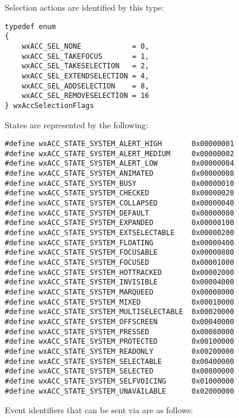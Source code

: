 Selection actions are identified by
this type:

{\small 
\begin{verbatim}
typedef enum
{
    wxACC_SEL_NONE            = 0,
    wxACC_SEL_TAKEFOCUS       = 1,
    wxACC_SEL_TAKESELECTION   = 2,
    wxACC_SEL_EXTENDSELECTION = 4,
    wxACC_SEL_ADDSELECTION    = 8,
    wxACC_SEL_REMOVESELECTION = 16
} wxAccSelectionFlags
\end{verbatim}
}

States are represented by the following:

{\small 
\begin{verbatim}
#define wxACC_STATE_SYSTEM_ALERT_HIGH       0x00000001
#define wxACC_STATE_SYSTEM_ALERT_MEDIUM     0x00000002
#define wxACC_STATE_SYSTEM_ALERT_LOW        0x00000004
#define wxACC_STATE_SYSTEM_ANIMATED         0x00000008
#define wxACC_STATE_SYSTEM_BUSY             0x00000010
#define wxACC_STATE_SYSTEM_CHECKED          0x00000020
#define wxACC_STATE_SYSTEM_COLLAPSED        0x00000040
#define wxACC_STATE_SYSTEM_DEFAULT          0x00000080
#define wxACC_STATE_SYSTEM_EXPANDED         0x00000100
#define wxACC_STATE_SYSTEM_EXTSELECTABLE    0x00000200
#define wxACC_STATE_SYSTEM_FLOATING         0x00000400
#define wxACC_STATE_SYSTEM_FOCUSABLE        0x00000800
#define wxACC_STATE_SYSTEM_FOCUSED          0x00001000
#define wxACC_STATE_SYSTEM_HOTTRACKED       0x00002000
#define wxACC_STATE_SYSTEM_INVISIBLE        0x00004000
#define wxACC_STATE_SYSTEM_MARQUEED         0x00008000
#define wxACC_STATE_SYSTEM_MIXED            0x00010000
#define wxACC_STATE_SYSTEM_MULTISELECTABLE  0x00020000
#define wxACC_STATE_SYSTEM_OFFSCREEN        0x00040000
#define wxACC_STATE_SYSTEM_PRESSED          0x00080000
#define wxACC_STATE_SYSTEM_PROTECTED        0x00100000
#define wxACC_STATE_SYSTEM_READONLY         0x00200000
#define wxACC_STATE_SYSTEM_SELECTABLE       0x00400000
#define wxACC_STATE_SYSTEM_SELECTED         0x00800000
#define wxACC_STATE_SYSTEM_SELFVOICING      0x01000000
#define wxACC_STATE_SYSTEM_UNAVAILABLE      0x02000000
\end{verbatim}
}

Event identifiers that can be sent via  are
as follows:


